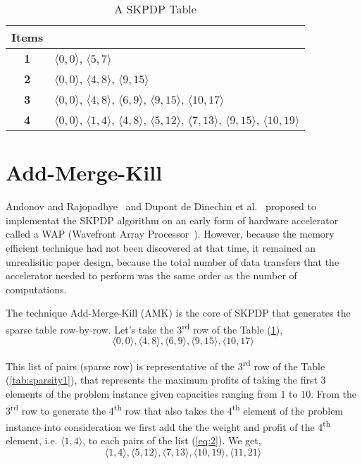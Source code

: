 \begin{table}[htbp]
\caption{A SKPDP Table}
\begin{center}
\begin{tabular}{|c|l|}
\hline
\textbf{Items}& \\
\hline 
  \textbf{1}& $\langle 0, 0\rangle$, $\langle 5, 7\rangle$  \\
  \hline
  \textbf{2}& $\langle 0, 0\rangle$, $\langle 4, 8\rangle$, $\langle 9, 15\rangle$ \\
  \hline
  \textbf{3}& $\langle 0, 0\rangle$, $\langle 4, 8\rangle$, $\langle 6, 9\rangle$, $\langle 9,
              15\rangle$, $\langle 10, 17\rangle$ \\
  \hline
  \textbf{4}& $\langle 0, 0\rangle$, $\langle 1, 4\rangle$, $\langle 4, 8\rangle$, $\langle 5,
              12\rangle$, $\langle 7, 13\rangle$, $\langle 9, 15\rangle$,
              $\langle 10, 19\rangle$ \\
  \hline
\end{tabular}
\label{tab:sparsity2}
\end{center}
\end{table}

\section{Add-Merge-Kill}

Andonov and Rajopadhye~\cite{sanjay-asap96} and Dupont de Dinechin et
al.~\cite{sanjay-irreg96} proposed to implementat the SKPDP algorithm on an
early form of hardware accelerator called a WAP (Wavefront Array
Processor~\cite{kung-sy-vlsi, kung-sy-etal}).  However, because the memory
efficient technique had not been discovered at that time, it remained an
unrealisitic paper design, because the total number of data transfers that the
accelerator needed to perform was the same order as the number of
computations.

The technique Add-Merge-Kill (AMK) is the core of SKPDP that generates the sparse table row-by-row. Let's take the 3\textsuperscript{rd} row of the Table (\ref{tab:sparsity2}),
\begin{equation}
\label{eq:list1}
\langle 0, 0\rangle, \langle 4, 8\rangle, \langle 6, 9\rangle, \langle 9, 15\rangle, \langle 10, 17\rangle
\end{equation}

This list of pairs (sparse row) is representative of the 3\textsuperscript{rd} row of the Table (\ref{tab:sparsity1}), that represents the maximum profits of taking the first 3 elements of the problem instance given capacities ranging from $1$ to $10$. From the 3\textsuperscript{rd} row to generate the 4\textsuperscript{th} row that also takes the 4\textsuperscript{th} element of the problem instance into consideration we first add the the weight and profit of the 4\textsuperscript{th} element, i.e. $\langle 1,4 \rangle$, to each pairs of the list (\ref{eq:2}).
We get,
\begin{equation}
\label{eq:list2}
\langle 1, 4\rangle, \langle 5, 12\rangle, \langle 7, 13\rangle, \langle 10, 19\rangle, \langle 11, 21\rangle
\end{equation}

